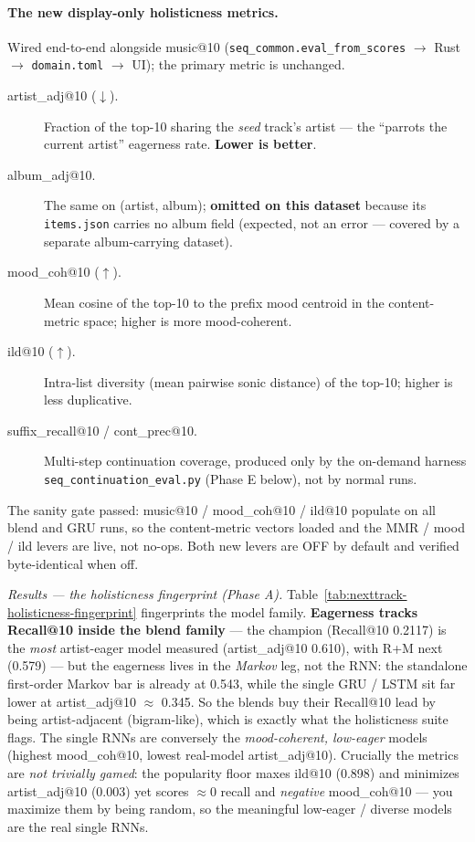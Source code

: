 \documentclass[11pt]{article}
\begin{document}
\paragraph{The new display-only holisticness metrics.} Wired end-to-end alongside
music@10 (\texttt{seq\_common.eval\_from\_scores} $\to$ Rust $\to$
\texttt{domain.toml} $\to$ UI); the primary metric is unchanged.
\begin{description}
  \item[artist\_adj@10 ($\downarrow$).] Fraction of the top-10 sharing the
  \emph{seed} track's artist --- the ``parrots the current artist'' eagerness rate.
  \textbf{Lower is better}.
  \item[album\_adj@10.] The same on (artist, album); \textbf{omitted on this
  dataset} because its \texttt{items.json} carries no album field (expected, not an
  error --- covered by a separate album-carrying dataset).
  \item[mood\_coh@10 ($\uparrow$).] Mean cosine of the top-10 to the prefix mood
  centroid in the content-metric space; higher is more mood-coherent.
  \item[ild@10 ($\uparrow$).] Intra-list diversity (mean pairwise sonic distance) of
  the top-10; higher is less duplicative.
  \item[suffix\_recall@10 / cont\_prec@10.] Multi-step continuation coverage,
  produced only by the on-demand harness \texttt{seq\_continuation\_eval.py}
  (Phase E below), not by normal runs.
\end{description}
The sanity gate passed: music@10 / mood\_coh@10 / ild@10 populate on all blend and
GRU runs, so the content-metric vectors loaded and the MMR / mood / ild levers are
live, not no-ops. Both new levers are OFF by default and verified byte-identical
when off.

\emph{Results --- the holisticness fingerprint (Phase A).} Table~\ref{tab:nexttrack-holisticness-fingerprint}
fingerprints the model family. \textbf{Eagerness tracks Recall@10 inside the blend
family} --- the champion (Recall@10 \num{0.2117}) is the \emph{most} artist-eager
model measured (artist\_adj@10 \num{0.610}), with R+M next (\num{0.579}) --- but the
eagerness lives in the \emph{Markov} leg, not the RNN: the standalone first-order
Markov bar is already at \num{0.543}, while the single GRU / LSTM sit far lower at
artist\_adj@10 $\approx$ \num{0.345}. So the blends buy their Recall@10 lead by being
artist-adjacent (bigram-like), which is exactly what the holisticness suite flags.
The single RNNs are conversely the \emph{mood-coherent, low-eager} models (highest
mood\_coh@10, lowest real-model artist\_adj@10). Crucially the metrics are \emph{not
trivially gamed}: the popularity floor maxes ild@10 (\num{0.898}) and minimizes
artist\_adj@10 (\num{0.003}) yet scores $\approx 0$ recall and \emph{negative}
mood\_coh@10 --- you maximize them by being random, so the meaningful low-eager /
diverse models are the real single RNNs.
\end{document}
